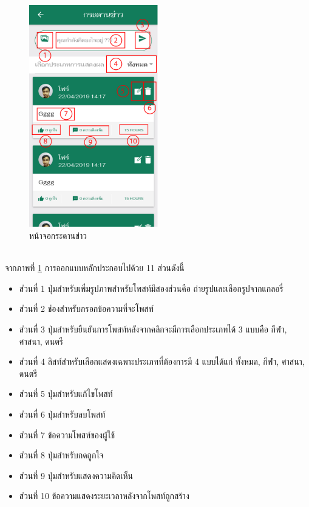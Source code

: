 		\begin{figure}[H]
			\centering
			\includegraphics[width=0.5\textwidth]{Figures/3/UI/board}
			\caption{หน้าจอกระดานข่าว}
			\label{Fig:กระดานข่าว}
		\end{figure} \\

		จากภาพที่ \ref{Fig:กระดานข่าว} การออกแบบหลักประกอบไปด้วย 11 ส่วนดังนี้
		
		\begin{itemize}
			\item ส่วนที่ 1 ปุ่มสำหรับเพิ่มรูปภาพสำหรับโพสท์มีสองส่วนคือ ถ่ายรูปและเลือกรูปจากแกลอรี่
			\item ส่วนที่ 2 ช่องสำหรับกรอกข้อความที่จะโพสท์
			\item ส่วนที่ 3 ปุ่มสำหรับยืนยันการโพสท์หลังจากคลิกจะมีการเลือกประเภทได้ 3 แบบคือ กีฬา, ศาสนา, ดนตรี
			\item ส่วนที่ 4 ลิสท์สำหรับเลือกแสดงเฉพาะประเภทที่ต้องการมี 4 แบบได้แก่ ทั้งหมด, กีฬา, ศาสนา, ดนตรี
			\item ส่วนที่ 5 ปุ่มสำหรับแก้ไขโพสท์
			\item ส่วนที่ 6 ปุ่มสำหรับลบโพสท์
			\item ส่วนที่ 7 ข้อความโพสท์ของผู้ใช้
			\item ส่วนที่ 8 ปุ่มสำหรับกดถูกใจ
			\item ส่วนที่ 9 ปุ่มสำหรับแสดงความคิดเห็น
			\item ส่วนที่ 10 ข้อความแสดงระยะเวลาหลังจากโพสท์ถูกสร้าง
		\end{itemize}

